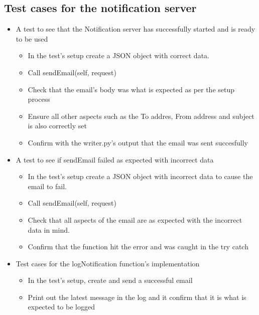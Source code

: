 \documentclass[11pt]{article}
\begin{document}
		\subsection{Test cases for the notification server}
			\begin{itemize}
				\item A test to see that the Notification server has successfully started and is ready to be used
					\begin{itemize}
						\item In the test's setup create a JSON object with correct data.
						\item Call sendEmail(self, request) 
						\item Check that the email's body was what is expected as per the setup process
						\item Ensure all other aspects such as the To addres, From address and subject is also correctly set
						\item Confirm with the writer.py's output that the email was sent succesfully
					\end{itemize}
				\item A test to see if sendEmail failed as expected with incorrect data 	
					\begin{itemize}
						\item In the test's setup create a JSON object with incorrect data to cause the email to fail.
						\item Call sendEmail(self, request) 
						\item Check that all aspects of the email are as expected with the incorrect data in mind.
						\item Confirm that the function hit the error and was caught in the try catch
					\end{itemize}
				\item Test cases for the logNotification function's implementation
					\begin{itemize}
						\item In the test's setup, create and send a successful email
						\item Print out the latest message in the log and it confirm that it is what is expected to be logged
					\end{itemize}
			\end{itemize}
\end{document}
